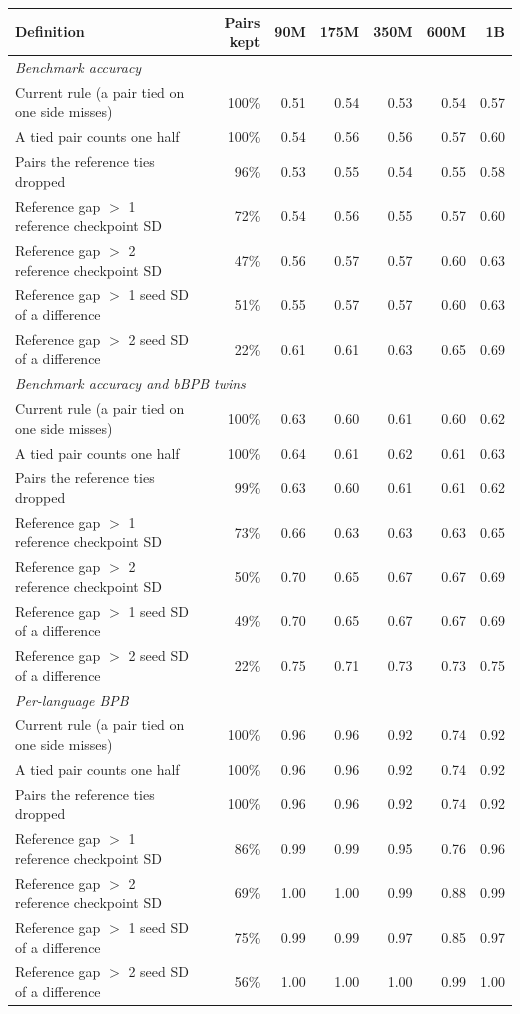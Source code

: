 \begin{tabular}{lrrrrrr}
\toprule
Definition & Pairs kept & 90M & 175M & 350M & 600M & 1B \\
\midrule
\multicolumn{7}{l}{\textit{Benchmark accuracy}} \\
Current rule (a pair tied on one side misses) & 100\% & 0.51 & 0.54 & 0.53 & 0.54 & 0.57 \\
A tied pair counts one half & 100\% & 0.54 & 0.56 & 0.56 & 0.57 & 0.60 \\
Pairs the reference ties dropped & 96\% & 0.53 & 0.55 & 0.54 & 0.55 & 0.58 \\
Reference gap $>$ 1 reference checkpoint SD & 72\% & 0.54 & 0.56 & 0.55 & 0.57 & 0.60 \\
Reference gap $>$ 2 reference checkpoint SD & 47\% & 0.56 & 0.57 & 0.57 & 0.60 & 0.63 \\
Reference gap $>$ 1 seed SD of a difference & 51\% & 0.55 & 0.57 & 0.57 & 0.60 & 0.63 \\
Reference gap $>$ 2 seed SD of a difference & 22\% & 0.61 & 0.61 & 0.63 & 0.65 & 0.69 \\
\midrule
\multicolumn{7}{l}{\textit{Benchmark accuracy and bBPB twins}} \\
Current rule (a pair tied on one side misses) & 100\% & 0.63 & 0.60 & 0.61 & 0.60 & 0.62 \\
A tied pair counts one half & 100\% & 0.64 & 0.61 & 0.62 & 0.61 & 0.63 \\
Pairs the reference ties dropped & 99\% & 0.63 & 0.60 & 0.61 & 0.61 & 0.62 \\
Reference gap $>$ 1 reference checkpoint SD & 73\% & 0.66 & 0.63 & 0.63 & 0.63 & 0.65 \\
Reference gap $>$ 2 reference checkpoint SD & 50\% & 0.70 & 0.65 & 0.67 & 0.67 & 0.69 \\
Reference gap $>$ 1 seed SD of a difference & 49\% & 0.70 & 0.65 & 0.67 & 0.67 & 0.69 \\
Reference gap $>$ 2 seed SD of a difference & 22\% & 0.75 & 0.71 & 0.73 & 0.73 & 0.75 \\
\midrule
\multicolumn{7}{l}{\textit{Per-language BPB}} \\
Current rule (a pair tied on one side misses) & 100\% & 0.96 & 0.96 & 0.92 & 0.74 & 0.92 \\
A tied pair counts one half & 100\% & 0.96 & 0.96 & 0.92 & 0.74 & 0.92 \\
Pairs the reference ties dropped & 100\% & 0.96 & 0.96 & 0.92 & 0.74 & 0.92 \\
Reference gap $>$ 1 reference checkpoint SD & 86\% & 0.99 & 0.99 & 0.95 & 0.76 & 0.96 \\
Reference gap $>$ 2 reference checkpoint SD & 69\% & 1.00 & 1.00 & 0.99 & 0.88 & 0.99 \\
Reference gap $>$ 1 seed SD of a difference & 75\% & 0.99 & 0.99 & 0.97 & 0.85 & 0.97 \\
Reference gap $>$ 2 seed SD of a difference & 56\% & 1.00 & 1.00 & 1.00 & 0.99 & 1.00 \\
\bottomrule
\end{tabular}
